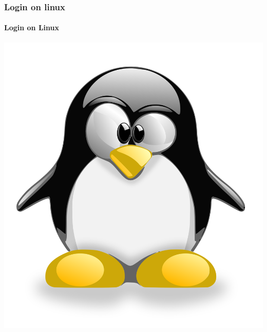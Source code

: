 \documentclass[unknownkeysallowed, 10pt, a4 paper, handout]{beamer}
\begin{document}
\begin{frame}[label=login]
  \frametitle{Login on linux}
  \framesubtitle{Login on Linux}
  \begin{center}
    \includegraphics[scale=0.11]{pics/TUX_G2.svg.png}
  \end{center}
\end{frame}
\end{document}
